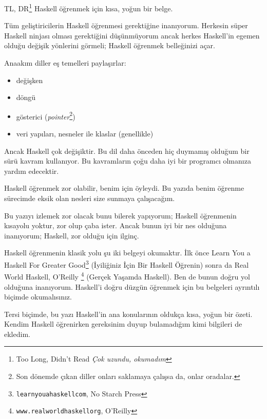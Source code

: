 \documentclass[a4paper,14pt,openany]{extbook} %
\let\emph\textit
\begin{document}
TL, DR\footnote{Too Long, Didn't Read \emph{Çok uzundu, okumadım}}  Haskell öğrenmek için kısa, yoğun bir belge.

Tüm geliştiricilerin Haskell öğrenmesi gerektiğine inanıyorum. Herkesin
süper Haskell ninjası olması gerektiğini düşünmüyorum ancak herkes
Haskell'in egemen olduğu değişik yönlerini görmeli; Haskell öğrenmek
belleğinizi açar.

Anaakım diller eş temelleri paylaşırlar:
\begin{itemize}
\item değişken
\item döngü
\item gösterici (\emph{pointer}\footnote{Son dönemde çıkan diller onları saklamaya çalışsa da, onlar oradalar.})
\item veri yapıları, nesneler ile klaslar (genellikle)
\end{itemize}
    
Ancak Haskell çok değişiktir. Bu dil daha önceden hiç duymamış olduğum bir
sürü kavram kullanıyor. Bu kavramların çoğu daha iyi bir programcı
olmanıza yardım edecektir.

Haskell öğrenmek zor olabilir, benim için öyleydi. Bu yazıda benim
öğrenme sürecimde eksik olan nesleri size sunmaya çalışacağım.

Bu yazıyı izlemek zor olacak bunu bilerek yapıyorum; Haskell öğrenmenin
kısayolu yoktur, zor olup çaba ister. Ancak bunun iyi bir nes olduğuna
inanıyorum; Haskell, zor olduğu için ilginç.

Haskell öğrenmenin klasik yolu şu iki belgeyi okumaktır. İlk önce
Learn You a Haskell For Greater Good\footnote{\texttt{learnyouahaskell\centerdot com}, No Starch Press} (İyiliğiniz İçin Bir Haskell Öğrenin) sonra da Real World Haskell, O'Reilly
\footnote{\texttt{www.realworldhaskell\centerdot org}, O'Reilly} (Gerçek Yaşamda Haskell).
Ben de bunun doğru yol olduğuna inanıyorum.
Haskell'i doğru düzgün öğrenmek için bu belgeleri ayrıntılı biçimde okumalısınız.

Tersi biçimde, bu yazı Haskell'in ana konularının oldukça kısa, yoğun
bir özeti. Kendim Haskell öğrenirken gereksinim duyup bulamadığım kimi
bilgileri de ekledim.
\end{document}
